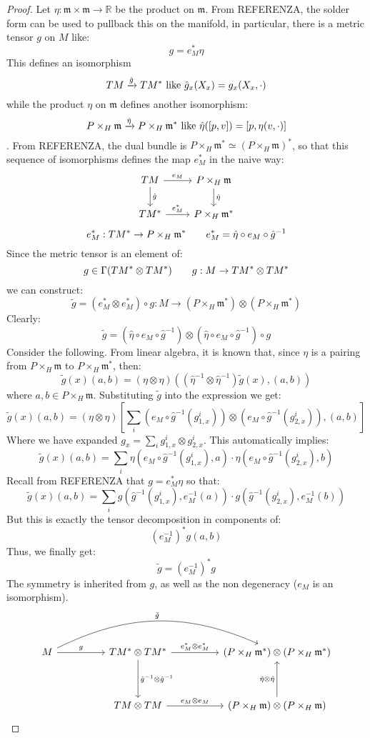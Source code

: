 \documentclass[12pt,a4paper]{report}
\theoremstyle{definition}
\theoremstyle{Theorem}
\theoremstyle{definition}
\theoremstyle{definition}
\begin{document}
	\begin{proof}
		Let $\eta:\mathfrak{m}\times\mathfrak{m}\rightarrow \mathbb{R}$ be the product on $\mathfrak{m}$. From REFERENZA, the solder form can be used to pullback this on the manifold, in particular, there is a metric tensor $g$ on $M$ like:
		$$g=e_M^*\eta$$ 
		This defines an isomorphism $$TM\xrightarrow{\hat{g}} TM^* \hbox{ like }\hat{g}_x(X_x)=g_x(X_x,\cdot)$$ while the product $\eta$ on $\mathfrak{m}$ defines another isomorphism:
		$$P\times_H \mathfrak{m}\xrightarrow{\hat{\eta}} P\times_H\mathfrak{m}^*\hbox{ like }\hat{\eta}([p,v])=[p,\eta(v,\cdot)]$$. From REFERENZA, the dual bundle is $P\times_H \mathfrak{m}^*\simeq (P\times_H\mathfrak{m})^*$, so that this sequence of isomorphisms defines the map $e_M^*$ in the naive way:
		$$
		\begin{tikzcd}
			TM\arrow{d}{\hat{g}}\arrow{r}{e_M} &P\times_H\mathfrak{m}\arrow{d}{\hat{\eta}}\\
			TM^*\arrow{r}{e_M^*}&P\times_H\mathfrak{m}^*
		\end{tikzcd}
		$$
		$$e_M^*:TM^*\rightarrow P\times_H\mathfrak{m}^* \hspace{20 pt} e_M^*=\hat{\eta}\circ e_M\circ \hat{g}^{-1}$$
		Since the metric tensor is an element of:
		$$g\in\Gamma(TM^*\otimes TM^*)\hspace{20 pt}g:M\rightarrow TM^*\otimes TM^*$$
		we can construct:
		$$\tilde{g}=(e_M^*\otimes e_M^*)\circ g:M\rightarrow (P\times_H \mathfrak{m}^*)\otimes (P\times_H \mathfrak{m}^*)$$
		Clearly:
		$$\tilde{g}=(\hat{\eta}\circ e_M\circ \hat{g}^{-1} )\otimes(\hat{\eta}\circ e_M\circ \hat{g}^{-1} )\circ g$$
		Consider the following. From linear algebra, it is known that, since $\eta$ is a pairing from $P\times_H \mathfrak{m}$ to $P\times_H \mathfrak{m}^*$, then:
		$$\tilde{g}(x)(a,b)=(\eta\otimes \eta)((\hat{\eta}^{-1}\otimes \hat{\eta}^{-1})\tilde{g}(x),(a,b))$$
		where $a,b\in P\times_H\mathfrak{m}$.
		Substituting $\tilde{g}$ into the expression we get:
		$$\tilde{g}(x)(a,b)=(\eta\otimes \eta)[\sum_i (e_M\circ \hat{g}^{-1}(g^i_{1,x}))\otimes (e_M\circ \hat{g}^{-1}(g^i_{2,x})),(a,b)]$$
		Where we have expanded $g_x=\sum_{i}g^i_{1,x}\otimes g^i_{2,x}$. This automatically implies:
		$$\tilde{g}(x)(a,b)=\sum_i \eta(e_M\circ \hat{g}^{-1}(g^i_{1,x}),a)\cdot \eta(e_M\circ \hat{g}^{-1}(g^i_{2,x}),b)$$
		Recall from REFERENZA that $g=e_M^*\eta$ so that:
		$$\tilde{g}(x)(a,b)=\sum_i g(\hat{g}^{-1}(g^i_{1,x}),e_M^{-1}(a))\cdot g(\hat{g}^{-1}(g^i_{2,x}),e_M^{-1}(b))$$
		But this is exactly the tensor decomposition in components of:
		$$(e_M^{-1})^*g(a,b)$$
		Thus, we finally get:
		$$\tilde{g}=(e_M^{-1})^*g$$
		The symmetry is inherited from $g$, as well as the non degeneracy ($e_M$ is an isomorphism).
		$$
		\begin{tikzcd}
			M \arrow{rr}{g} \arrow[bend left=25]{rrrr}{\tilde{g}} && TM^*\otimes TM^* \arrow{rr}{e_M^*\otimes e_M^*} \arrow{dd}{\hat{g}^{-1}\otimes \hat{g}^{-1}} && (P\times_H \mathfrak{m}^*)\otimes (P\times_H \mathfrak{m}^*)\\\\
			&& TM\otimes TM \arrow{rr}{e_M\otimes e_M} && (P\times_H \mathfrak{m})\otimes (P\times_H \mathfrak{m}) \arrow{uu}{\hat{\eta}\otimes \hat{\eta}}
		\end{tikzcd}
		$$
	\end{proof}
\end{document}
